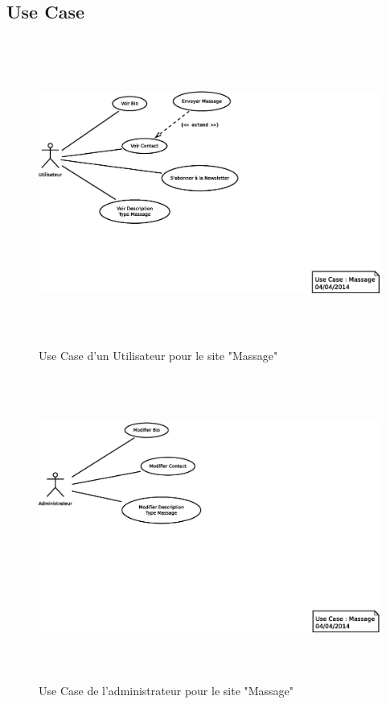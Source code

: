 \documentclass[11pt,a4paper]{report}
\begin{document}
			\subsection{Use Case}\paragraph*{}
			\begin{figure}[H]
				\centering
				\includegraphics[height=10cm]{UseCase-Massage-User.eps}
				\caption[Use Case Utilisateur Massage]{Use Case d'un Utilisateur pour le site "Massage"}
				\label{fig:UseCase-Massage_User}
			\end{figure}
			\begin{figure}[H]
				\centering
				\includegraphics[height=10cm]{UseCase-Massage-Administrateur.eps}
				\caption[Use Case Administrateur Massage]{Use Case de l'administrateur pour le site "Massage"}
				\label{fig:UseCase-Massage_Admin}
			\end{figure}
\end{document}
